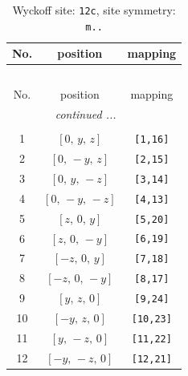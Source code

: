 \documentclass[fleqn,8pt]{jsarticle}
\begin{document}
\begin{longtable}{ccc}
\caption{Wyckoff site: {\tt 12c}, site symmetry: {\tt m..}}
 \\
 \hline \hline
No. & position & mapping \\ \hline \endfirsthead

\multicolumn{2}{l}{\tablename\ \thetable{}} \\
 \hline \hline
No. & position & mapping \\ \hline \endhead

 \hline \hline
\multicolumn{2}{r}{\footnotesize\it continued ...} \\ \endfoot

 \hline \hline
\multicolumn{2}{r}{} \\ \endlastfoot

1 & $\left[ 0,\, y,\, z \right]$ & {\tt [1,16]} \\ \hline
2 & $\left[ 0,\, - y,\, z \right]$ & {\tt [2,15]} \\ \hline
3 & $\left[ 0,\, y,\, - z \right]$ & {\tt [3,14]} \\ \hline
4 & $\left[ 0,\, - y,\, - z \right]$ & {\tt [4,13]} \\ \hline
5 & $\left[ z,\, 0,\, y \right]$ & {\tt [5,20]} \\ \hline
6 & $\left[ z,\, 0,\, - y \right]$ & {\tt [6,19]} \\ \hline
7 & $\left[ - z,\, 0,\, y \right]$ & {\tt [7,18]} \\ \hline
8 & $\left[ - z,\, 0,\, - y \right]$ & {\tt [8,17]} \\ \hline
9 & $\left[ y,\, z,\, 0 \right]$ & {\tt [9,24]} \\ \hline
10 & $\left[ - y,\, z,\, 0 \right]$ & {\tt [10,23]} \\ \hline
11 & $\left[ y,\, - z,\, 0 \right]$ & {\tt [11,22]} \\ \hline
12 & $\left[ - y,\, - z,\, 0 \right]$ & {\tt [12,21]} \\
\end{longtable}
\renewcommand{\arraystretch}{1.2}
\end{document}
